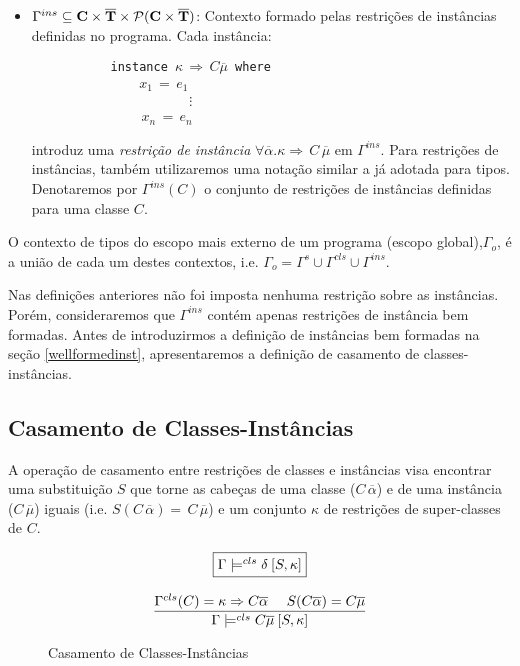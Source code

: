 \begin{itemize}
	\item $\Gamma^{ins}\subseteq \text{\textbf{C}}\times\overline{\text{\textbf{T}}}\times
	      \mathcal{P}(\textbf{C}\times\overline{\text{\textbf{T}}})$: 
	      Contexto formado pelas restri\c{c}\~oes de inst\^ancias definidas no programa. Cada inst\^ancia:
\begin{flushleft}
\verb|           |\texttt{instance $\kappa\,\Rightarrow\,C\overline{\mu}$ where}\\
\verb|               | $x_{1}\,=\, e_{1}$\\
\verb|                      |$\vdots$\\
\verb|               |$\,x_{n}\,=\,e_{n}$
\end{flushleft}
introduz uma \emph{restri\c{c}\~ao de inst\^ancia} $\forall\overline{\alpha}.\kappa\Rightarrow\,C\,\overline{\mu}$ 
em $\Gamma^{ins}$. Para restri\c{c}\~oes de inst\^ancias, tamb\'em utilizaremos uma nota\c{c}\~ao similar a j\'a
adotada para tipos. Denotaremos por $\Gamma^{ins}(C)$ o conjunto de restri\c{c}\~oes de inst\^ancias definidas para
uma classe $C$.    
\end{itemize}
O contexto de tipos do escopo mais externo de um programa (escopo global),$\Gamma_{o}$, \'e a uni\~ao de cada um
destes contextos, i.e.  $\Gamma_{o} = \Gamma^{s}\cup\Gamma^{cls}\cup\Gamma^{ins}$. 
 
Nas defini\c{c}\~oes anteriores n\~ao foi imposta nenhuma restri\c{c}\~ao sobre as inst\^ancias. Por\'em, consideraremos
que $\Gamma^{ins}$ cont\'em apenas restri\c{c}\~oes de inst\^ancia bem formadas. Antes de introduzirmos a 
defini\c{c}\~ao de inst\^ancias bem formadas na se\c{c}\~ao \ref{wellformedinst}, apresentaremos a defini\c{c}\~ao de
casamento de classes-inst\^ancias.

\subsection{Casamento de Classes-Inst\^ancias}\label{classinstmatching}

A opera\c{c}\~ao de casamento entre restri\c{c}\~oes de classes e inst\^ancias visa encontrar uma substitui\c{c}\~ao $S$
que torne as cabe\c{c}as de uma classe ($C\,\overline{\alpha}$) e de uma inst\^ancia ($C\,\overline{\mu}$) iguais
(i.e. $S(C\,\overline{\alpha})=\,C\,\overline{\mu}$) e um conjunto $\kappa$ de restri\c{c}\~oes de super-classes de $C$.

\begin{figure}[h]
\small{
\[ \begin{array}{c} 
   \fbox{$\Gamma \models^{cls} \delta\:[S,\kappa]$} \\ [.5cm]
   \displaystyle{\frac{\Gamma^{cls}(C) = \kappa \Rightarrow C \overline{\alpha}\:\:\:\:\:\: S(C \overline{\alpha})=C \overline{\mu}}
	                  {\Gamma \models^{cls} C\overline{\mu}\:[S,\kappa]}} 
   \end{array}
\]}
\caption{Casamento de Classes-Inst\^ancias}
\label{figclassinstmatching} 
\end{figure}



